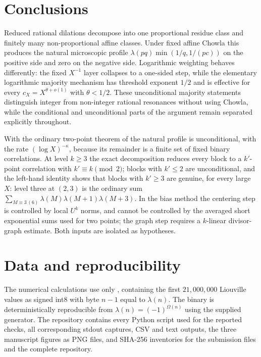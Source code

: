 \documentclass[preprint,12pt]{elsarticle}
\numberwithin{equation}{section}
\theoremstyle{plain}
\theoremstyle{definition}
\theoremstyle{definition}
\theoremstyle{remark}
\begin{document}
\section{Conclusions}
\label{sec:conclusions}

Reduced rational dilations decompose into one proportional residue class and
finitely many non-proportional affine classes. Under fixed affine Chowla this
produces the natural microscopic profile
$\lambda(pq)\min(1/q,1/(pc))$ on the positive side and zero on the negative
side. Logarithmic weighting behaves differently: the fixed $X^{-1}$ layer
collapses to a one-sided step, while the elementary logarithmic majority mechanism has threshold
exponent $1/2$ and is effective for every
$c_X=X^{\theta+o(1)}$ with $\theta<1/2$. These unconditional majority
statements distinguish integer from non-integer rational resonances without
using Chowla, while the conditional and unconditional parts of the argument
remain separated explicitly throughout.


With the ordinary two-point theorem of \cite{OpenAI2026} the natural profile
is unconditional, with the rate $(\log X)^{-\kappa}$, because its remainder is
a finite set of fixed binary correlations. At level $k\ge3$ the exact
decomposition reduces every block to a $k'$-point correlation with
$k'\equiv k\pmod2$; blocks with $k'\le2$ are unconditional, and the
left-hand identity shows that blocks with $k'\ge3$ are genuine, for every
large $X$: level three at $(2,3)$ is the ordinary sum
$\sum_{M\equiv3\,(6)}\lambda(M)\lambda(M+1)\lambda(M+3)$. In the bias method
the centering step is controlled by local $U^k$ norms, and cannot be
controlled by the averaged short exponential sums used for two points; the
graph step requires a $k$-linear divisor-graph estimate. Both inputs are
isolated as hypotheses.

\section{Data and reproducibility}
\label{sec:data}

The numerical calculations use only
, containing the first $21{,}000{,}000$
Liouville values as signed int8 with byte $n-1$ equal to $\lambda(n)$. The
binary is deterministically reproducible from
$\lambda(n)=(-1)^{\Omega(n)}$ using the supplied generator. The repository
contains every Python script used for the reported checks, all corresponding
stdout captures, CSV and text outputs, the three manuscript figures as PNG
files, and SHA-256 inventories for the submission files and the complete
repository.
\end{document}
